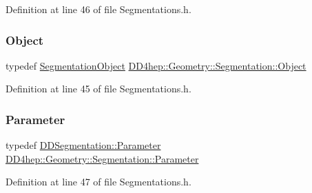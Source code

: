 Definition at line 46 of file Segmentations.\+h.

\hypertarget{class_d_d4hep_1_1_geometry_1_1_segmentation_a91154cc3b58985ac86388d00572ee48f}{}\label{class_d_d4hep_1_1_geometry_1_1_segmentation_a91154cc3b58985ac86388d00572ee48f} 
\subsubsection{\texorpdfstring{Object}{Object}}
{\footnotesize\ttfamily typedef \hyperlink{class_d_d4hep_1_1_geometry_1_1_segmentation_object}{Segmentation\+Object} \hyperlink{class_d_d4hep_1_1_geometry_1_1_segmentation_a91154cc3b58985ac86388d00572ee48f}{D\+D4hep\+::\+Geometry\+::\+Segmentation\+::\+Object}}



Definition at line 45 of file Segmentations.\+h.

\hypertarget{class_d_d4hep_1_1_geometry_1_1_segmentation_a179c843c1bc64eabb85be55e2538be19}{}\label{class_d_d4hep_1_1_geometry_1_1_segmentation_a179c843c1bc64eabb85be55e2538be19} 
\subsubsection{\texorpdfstring{Parameter}{Parameter}}
{\footnotesize\ttfamily typedef \hyperlink{namespace_d_d4hep_1_1_d_d_segmentation_af6c6bad2a745d807a0ed00506fb34ccf}{D\+D\+Segmentation\+::\+Parameter} \hyperlink{class_d_d4hep_1_1_geometry_1_1_segmentation_a179c843c1bc64eabb85be55e2538be19}{D\+D4hep\+::\+Geometry\+::\+Segmentation\+::\+Parameter}}



Definition at line 47 of file Segmentations.\+h.

\hypertarget{class_d_d4hep_1_1_geometry_1_1_segmentation_af7d9af7b574fa9039f44befc61b7e46f}{}\label{class_d_d4hep_1_1_geometry_1_1_segmentation_af7d9af7b574fa9039f44befc61b7e46f} 
